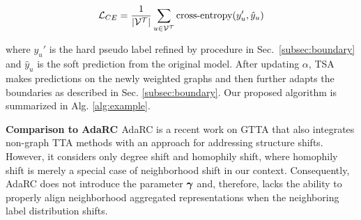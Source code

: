 


\vspace{-5mm}
\begin{equation}
    {\mathcal{L}}_{CE} = \frac{1}{|{\mathcal{V}}^{{\mathcal{T}}}|}\sum_{u\in{\mathcal{V}}^{{\mathcal{T}}}}\text{cross-entropy}(y_u',\hat{y}_u) 
    \label{eq:loss}
\end{equation}
\vspace{-2mm}

where $y_u'$ is the hard pseudo label refined by procedure in Sec.~\ref{subsec:boundary} and $\hat{y}_u$ is the soft prediction from the original model.
After updating $\alpha$, TSA makes predictions on the newly weighted graphs and then further adapts the boundaries as described in Sec. \ref{subsec:boundary}. %
Our proposed algorithm is summarized in Alg. \ref{alg:example}. %


\textbf{Comparison to AdaRC \cite{bao2024adarc}}
AdaRC is a recent work on GTTA that also integrates non-graph TTA methods with an approach for addressing structure shifts. However, it considers only degree shift and homophily shift, where homophily shift is merely a special case of neighborhood shift in our context. Consequently, AdaRC does not introduce the parameter $\boldsymbol{\gamma}$ and, therefore, lacks the ability to properly align neighborhood aggregated representations when the neighboring label distribution shifts. 















